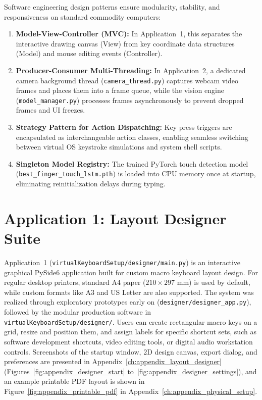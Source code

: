 Software engineering design patterns ensure modularity, stability, and responsiveness on standard commodity computers:
\begin{enumerate}
    \item \textbf{Model-View-Controller (MVC):} In Application~1, this separates the interactive drawing canvas (View) from key coordinate data structures (Model) and mouse editing events (Controller).
    \item \textbf{Producer-Consumer Multi-Threading:} In Application~2, a dedicated camera background thread (\texttt{camera\_thread.py}) captures webcam video frames and places them into a frame queue, while the vision engine (\texttt{model\_manager.py}) processes frames asynchronously to prevent dropped frames and UI freezes.
    \item \textbf{Strategy Pattern for Action Dispatching:} Key press triggers are encapsulated as interchangeable action classes, enabling seamless switching between virtual OS keystroke simulations and system shell scripts.
    \item \textbf{Singleton Model Registry:} The trained PyTorch touch detection model (\texttt{best\_finger\_touch\_lstm.pth}) is loaded into CPU memory once at startup, eliminating reinitialization delays during typing.
\end{enumerate}

\section{Application 1: Layout Designer Suite}
\label{sec:meth_layout_designer}
Application~1 (\texttt{virtualKeyboardSetup/designer/main.py}) is an interactive graphical PySide6 application built for custom macro keyboard layout design. For regular desktop printers, standard A4 paper ($210 \times 297\text{ mm}$) is used by default, while custom formats like A3 and US Letter are also supported. The system was realized through exploratory prototypes early on (\texttt{designer/designer\_app.py}), followed by the modular production software in \texttt{virtualKeyboardSetup/designer/}. Users can create rectangular macro keys on a grid, resize and position them, and assign labels for specific shortcut sets, such as software development shortcuts, video editing tools, or digital audio workstation controls. Screenshots of the startup window, 2D design canvas, export dialog, and preferences are presented in Appendix~\ref{ch:appendix_layout_designer} (Figures~\ref{fig:appendix_designer_start} to~\ref{fig:appendix_designer_settings}), and an example printable PDF layout is shown in Figure~\ref{fig:appendix_printable_pdf} in Appendix~\ref{ch:appendix_physical_setup}.

